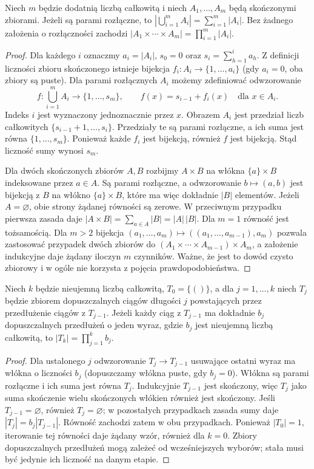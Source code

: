 \begin{stwierdzenie}
Niech $m$ będzie dodatnią liczbą całkowitą i niech $A_1,\dots,A_m$ będą skończonymi zbiorami.
Jeżeli są parami rozłączne, to $|\bigcup_{i=1}^m A_i|=\sum_{i=1}^m|A_i|$.
Bez żadnego założenia o rozłączności zachodzi
$|A_1\times\cdots\times A_m|=\prod_{i=1}^m|A_i|$.
\end{stwierdzenie}
\begin{proof}
Dla każdego $i$ oznaczmy $a_i=|A_i|$, $s_0=0$ oraz
$s_i=\sum_{h=1}^i a_h$. Z definicji liczności zbioru skończonego
istnieje bijekcja $f_i:A_i\to\{1,\ldots,a_i\}$ (gdy $a_i=0$,
oba zbiory są puste). Dla parami rozłącznych $A_i$ możemy
zdefiniować odwzorowanie
\[
f:\bigcup_{i=1}^m A_i\longrightarrow\{1,\ldots,s_m\},
\qquad f(x)=s_{i-1}+f_i(x)\quad\text{dla }x\in A_i.
\]
Indeks $i$ jest wyznaczony jednoznacznie przez $x$.
Obrazem $A_i$ jest przedział liczb całkowitych
$\{s_{i-1}+1,\ldots,s_i\}$. Przedziały te są parami
rozłączne, a ich suma jest równa $\{1,\ldots,s_m\}$.
Ponieważ każde $f_i$ jest bijekcją, również $f$ jest
bijekcją. Stąd liczność sumy wynosi $s_m$.

Dla dwóch skończonych zbiorów $A,B$ rozbijmy $A\times B$
na włókna $\{a\}\times B$ indeksowane przez $a\in A$.
Są parami rozłączne, a odwzorowanie $b\mapsto(a,b)$ jest
bijekcją z $B$ na włókno $\{a\}\times B$, które ma więc
dokładnie $|B|$ elementów.
Jeżeli $A=\varnothing$, obie strony żądanej równości są
zerowe. W przeciwnym przypadku pierwsza zasada daje
$|A\times B|=\sum_{a\in A}|B|=|A|\,|B|$.
Dla $m=1$ równość jest tożsamością. Dla $m>2$ bijekcja
$(a_1,\ldots,a_m)\mapsto((a_1,\ldots,a_{m-1}),a_m)$
pozwala zastosować przypadek dwóch zbiorów do
$(A_1\times\cdots\times A_{m-1})\times A_m$,
a założenie indukcyjne daje żądany iloczyn $m$ czynników.
Ważne, że jest to dowód czysto zbiorowy i w ogóle
nie korzysta z pojęcia prawdopodobieństwa.
\end{proof}

\begin{stwierdzenie}
Niech $k$ będzie nieujemną liczbą całkowitą, $T_0=\{()\}$,
a dla $j=1,\ldots,k$ niech $T_j$ będzie
zbiorem dopuszczalnych ciągów długości $j$ powstających przez
przedłużenie ciągów z $T_{j-1}$. Jeżeli każdy ciąg z $T_{j-1}$
ma dokładnie $b_j$ dopuszczalnych przedłużeń o jeden wyraz,
gdzie $b_j$ jest nieujemną liczbą całkowitą, to
$|T_k|=\prod_{j=1}^k b_j$.
\end{stwierdzenie}
\begin{proof}
Dla ustalonego $j$ odwzorowanie $T_j\to T_{j-1}$ usuwające
ostatni wyraz ma włókna o liczności $b_j$ (dopuszczamy włókna
puste, gdy $b_j=0$). Włókna są parami rozłączne i ich suma jest równa $T_j$.
Indukcyjnie $T_{j-1}$ jest skończony, więc $T_j$ jako suma
skończenie wielu skończonych włókien również jest skończony.
Jeśli $T_{j-1}=\varnothing$, również $T_j=\varnothing$;
w pozostałych przypadkach zasada sumy daje
$|T_j|=b_j|T_{j-1}|$. Równość zachodzi zatem w obu przypadkach.
Ponieważ $|T_0|=1$, iterowanie tej równości daje żądany wzór,
również dla $k=0$. Zbiory dopuszczalnych przedłużeń mogą zależeć
od wcześniejszych wyborów; stała musi być jedynie ich liczność
na danym etapie.
\end{proof}

